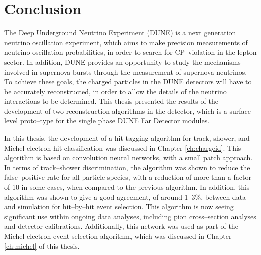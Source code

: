 \chapter{\label{ch:conclusion}Conclusion} 


\minitoc

The Deep Underground Neutrino Experiment (DUNE) is a next generation neutrino
oscillation experiment, which aims to make precision measurements of neutrino
oscillation probabilities, in order to search for CP--violation in the lepton
sector. In addition, DUNE provides an opportunity to study the mechanisms
involved in supernova bursts through the measurement of supernova neutrinos. 
To achieve these goals, the charged particles in the DUNE detectors will have to
be accurately reconstructed, in order to allow the details of the neutrino
interactions to be determined. This thesis presented the results of the
development of two reconstruction algorithms in the \protodune{} detector, which
is a surface level proto--type for the single phase DUNE Far Detector modules. 

In this thesis, the development of a hit tagging algorithm for track, shower, 
and Michel electron hit classification was discussed in Chapter 
\ref{ch:chargeid}. This algorithm is based on convolution neural networks, 
with a small patch approach. In terms of track--shower discrimination, the 
algorithm was shown to reduce the false--positive rate for all particle 
species, with a reduction of more than a factor of 10 in some cases, when
compared to the previous algorithm. In addition, this algorithm was shown to 
give a good agreement, of around 1--3\%, between data and simulation for 
hit--by--hit event selection. This algorithm is now seeing significant use 
within ongoing \protodune{} data analyses, including pion cross--section 
analyses and detector calibrations. Additionally, this network was used as 
part of the Michel electron event selection algorithm, which was discussed in 
Chapter \ref{ch:michel} of this thesis.

